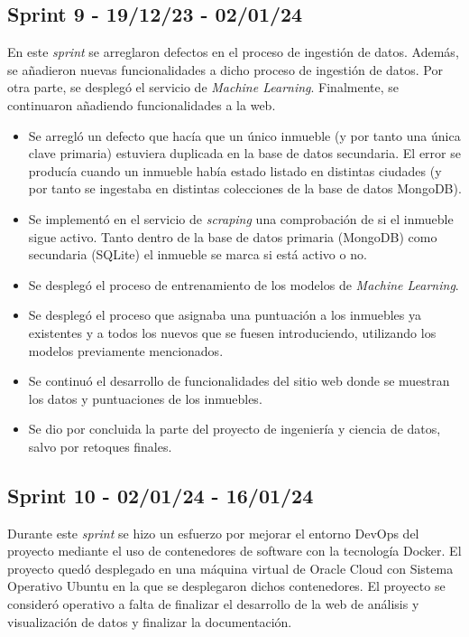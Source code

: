\subsection{Sprint 9 -  19/12/23 - 02/01/24}

En este \textit{sprint} se arreglaron defectos en el proceso de ingestión de datos. Además, se añadieron nuevas funcionalidades a dicho proceso de ingestión de datos. Por otra parte, se desplegó el servicio de \textit{\textit{Machine Learning}}. Finalmente, se continuaron añadiendo funcionalidades a la web.

\begin{itemize}

    \item Se arregló un defecto que hacía que un único inmueble (y por tanto una única clave primaria) estuviera duplicada en la base de datos secundaria. El error se producía cuando un inmueble había estado listado en distintas ciudades (y por tanto se ingestaba en distintas colecciones de la base de datos MongoDB).
    \item     Se implementó en el servicio de \textit{scraping} una comprobación de si el inmueble sigue activo. Tanto dentro de la base de datos primaria (MongoDB) como secundaria (SQLite) el inmueble se marca si está activo o no.
    \item Se desplegó el proceso de entrenamiento de los modelos de \textit{Machine Learning}.
    \item Se desplegó el proceso que asignaba una puntuación a los inmuebles ya existentes y a todos los nuevos que se fuesen introduciendo, utilizando los modelos previamente mencionados.
    \item Se continuó el desarrollo de funcionalidades del sitio web donde se muestran los datos y puntuaciones de los inmuebles.
    \item Se dio por concluida la parte del proyecto de ingeniería y ciencia de datos, salvo por retoques finales.
\end{itemize}

\subsection{Sprint 10 -  02/01/24 - 16/01/24}

Durante este \textit{sprint} se hizo un esfuerzo por mejorar el entorno DevOps del proyecto mediante el uso de contenedores de software con la tecnología Docker. El proyecto quedó desplegado en una máquina virtual de Oracle Cloud con Sistema Operativo Ubuntu en la que se desplegaron dichos contenedores. El proyecto se consideró operativo a falta de finalizar el desarrollo de la web de análisis y visualización de datos y finalizar la documentación.

